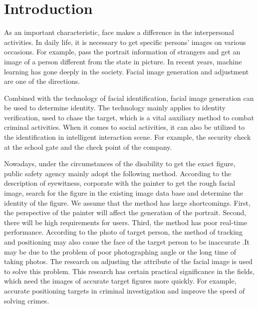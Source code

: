 \section{Introduction}
As an important characteristic, face makes a difference in the interpersonal activities.
In daily life, it is necessary to get specific persons' images on various occasions.
For example, pass the portrait information of strangers and get an image of a person different from the state in picture.
In recent years, machine learning has gone deeply in the society.
Facial image generation and adjustment are one of the directions.

Combined with the technology of facial identification, facial image generation can be used to determine identity.
The technology mainly applies to identity verification, used to chase the target, which is a vital auxiliary method to combat criminal activities.
When it comes to social activities, it can also be utilized to the identification in intelligent interaction scene. For example, the security check at the school gate and the check point of the company.

Nowadays, under the circumstances of the disability to get the exact figure,
    public safety agency mainly adopt the following method.
According to the description of eyewitness, corporate with the painter to get the rough facial image,
    search for the figure in the existing image data base and determine the identity of the figure.
We assume that the method has large shortcomings.
First, the perspective of the painter will affect the generation of the portrait.
    Second, there will be high requirements for users.
    Third, the method has poor real-time performance.
According to the photo of target person, the method of tracking and positioning may also cause the face of the target person to be inaccurate .It may be due to the problem of poor photographing angle or the long time of taking photos.
The research on adjusting the attribute of the facial image is used to solve this problem.
This research has certain practical significance in the fields, which need the images of accurate target figures more quickly. For example, accurate positioning targets in criminal investigation and improve the speed of solving crimes.